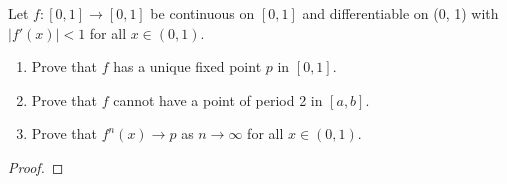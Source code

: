 \begin{problem}{5}
  Let $f:[0,1] \to [0,1]$ be continuous on $[0,1]$ and differentiable on (0, 1)
  with $|f'(x)| < 1$ for all $x\in (0, 1)$.

  \begin{enumerate}
    \item Prove that $f$ has a unique fixed point $p$ in $[0,1]$.
    \item Prove that $f$ cannot have a point of period 2 in $[a,b]$.
    \item Prove that $f^n(x) \to p$ as $n\to\infty$ for all $x\in(0,1)$.
  \end{enumerate}
\end{problem}

\begin{proof}
\end{proof}
\newpage
